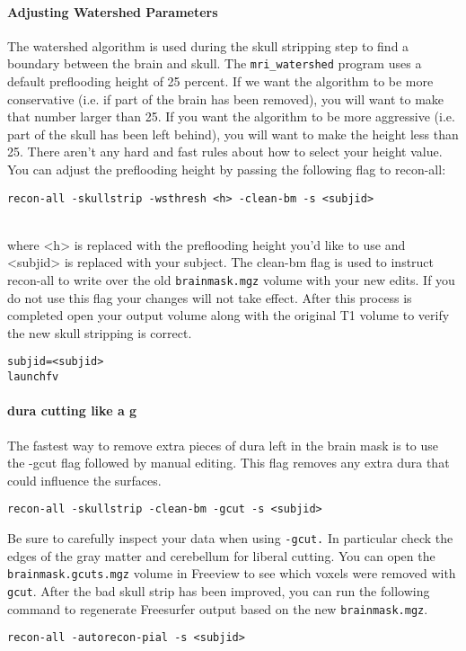 \documentclass[paper=a4, fontsize=11pt]{scrartcl} %
\numberwithin{equation}{section} %
\numberwithin{figure}{section} %
\numberwithin{table}{section} %
\begin{document}
\paragraph{Adjusting Watershed Parameters} The watershed algorithm is used during the skull stripping step to find a boundary between the brain and skull. The \texttt{mri\_watershed} program uses a default preflooding height of 25 percent. If we want the algorithm to be more conservative (i.e. if part of the brain has been removed), you will want to make that number larger than 25. If you want the algorithm to be more aggressive (i.e. part of the skull has been left behind), you will want to make the height less than 25. There aren't any hard and fast rules about how to select your height value. You can adjust the preflooding height by passing the following flag to recon-all:
~\\
\begin{lstlisting}[frame=single]
recon-all -skullstrip -wsthresh <h> -clean-bm -s <subjid>
\end{lstlisting}
~\\
where <h> is replaced with the preflooding height you'd like to use and <subjid> is replaced with your subject. The clean-bm flag is used to instruct recon-all to write over the old \texttt{brainmask.mgz} volume with your new edits. If you do not use this flag your changes will not take effect.  After this process is completed open your output volume along with the original T1 volume to verify the new skull stripping is correct.
~\\
\begin{lstlisting}[frame=single]
subjid=<subjid>
launchfv 
\end{lstlisting}
\paragraph{dura cutting like a g} The fastest way to remove extra pieces of dura left in the brain mask is to use the -gcut flag followed by manual editing.  This flag removes any extra dura that could influence the surfaces.
~\\
\begin{lstlisting}[frame=single]
recon-all -skullstrip -clean-bm -gcut -s <subjid>
\end{lstlisting}
Be sure to carefully inspect your data when using \texttt{-gcut.}  In particular check the edges of the gray matter and cerebellum for liberal cutting. You can open the \texttt{brainmask.gcuts.mgz} volume in Freeview to see which voxels were removed with \texttt{gcut}. After the bad skull strip has been improved, you can run the following command to regenerate Freesurfer output based on the new \texttt{brainmask.mgz}.
~\\
\begin{lstlisting}[frame=single]
recon-all -autorecon-pial -s <subjid>
\end{lstlisting}
\end{document}
